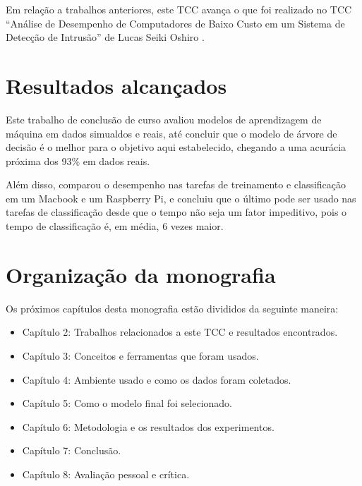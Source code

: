Em relação a trabalhos anteriores, este TCC avança o que foi realizado no TCC “Análise de Desempenho de Computadores de Baixo Custo em um Sistema de 
Detecção de Intrusão” de Lucas Seiki Oshiro \cite{tcc:lucas}.

\section{Resultados alcançados}

Este trabalho de conclusão de curso avaliou modelos de aprendizagem de máquina em dados simualdos e 
reais, até concluir que o modelo de árvore de decisão é o melhor para o objetivo aqui estabelecido, 
chegando a uma acurácia próxima dos 93\% em dados reais.

Além disso, comparou o desempenho nas tarefas de treinamento e classificação em um Macbook e um 
Raspberry Pi, e concluiu que o último pode ser usado nas tarefas de classificação desde que o tempo
não seja um fator impeditivo, pois o tempo de classificação é, em média, 6 vezes maior.

\section{Organização da monografia}

Os próximos capítulos desta monografia estão divididos da seguinte maneira: 

\begin{itemize}
    \item Capítulo 2: Trabalhos relacionados a este TCC e resultados encontrados.
    \item Capítulo 3: Conceitos e ferramentas que foram usados.
    \item Capítulo 4: Ambiente usado e como os dados foram coletados.
    \item Capítulo 5: Como o modelo final foi selecionado.
    \item Capítulo 6: Metodologia e os resultados dos experimentos.
    \item Capítulo 7: Conclusão.
    \item Capítulo 8: Avaliação pessoal e crítica.
\end{itemize}